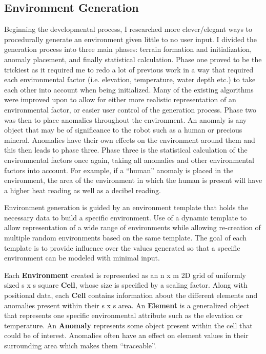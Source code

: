 \documentclass[]{report}
\begin{document}
\subsection{Environment Generation}
Beginning the developmental process, I researched more clever/elegant ways to procedurally generate an environment given little to no user input.
I divided the generation process into three main phases: terrain formation and initialization, anomaly placement, and finally statistical calculation.
Phase one proved to be the trickiest as it required me to redo a lot of previous work in a way that required each environmental factor (i.e. elevation, temperature, water depth etc.) to take each other into account when being initialized.
Many of the existing algorithms were improved upon to allow for either more realistic representation of an environmental factor, or easier user control of the generation process.
Phase two was then to place anomalies throughout the environment.
An anomaly is any object that may be of significance to the robot such as a human or precious mineral.
Anomalies have their own effects on the environment around them and this then leads to phase three.
Phase three is the statistical calculation of the environmental factors once again, taking all anomalies and other environmental factors into account.
For example, if a “human” anomaly is placed in the environment, the area of the environment in which the human is present will have a higher heat reading as well as a decibel reading.

Environment generation is guided by an environment template that holds the necessary data to build a specific environment. 
Use of a dynamic template to allow representation of a wide range of environments while allowing re-creation of multiple random environments based on the same template.
The goal of each template is to provide influence over the values generated so that a specific environment can be modeled with minimal input.

Each \textbf{Environment} created is represented as an n x m 2D grid of uniformly sized s x s square \textbf{Cell}, whose size is specified by a scaling factor.
Along with positional data, each \textbf{Cell} contains information about the different elements and anomalies present within their s x s area.
An \textbf{Element} is a generalized object that represents one specific environmental attribute such as the elevation or temperature.
An \textbf{Anomaly} represents some object present within the cell that could be of interest.
Anomalies often have an effect on element values in their surrounding area which makes them “traceable”.
\end{document}
